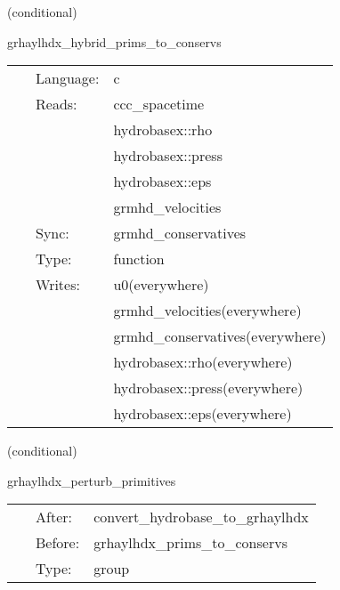 \documentclass{article}
\begin{document}
\vspace{5mm}

   (conditional) 

\hspace{5mm} grhaylhdx\_hybrid\_prims\_to\_conservs 

\hspace{5mm}{\it hybrid version of grhaylhdx\_prims\_to\_conservs } 


\hspace{5mm}

 \begin{tabular*}{160mm}{cll} 
~ & Language:  & c \\ 
~ & Reads:  & ccc\_spacetime \\ 
~& ~ &hydrobasex::rho\\ 
~& ~ &hydrobasex::press\\ 
~& ~ &hydrobasex::eps\\ 
~& ~ &grmhd\_velocities\\ 
~ & Sync:  & grmhd\_conservatives \\ 
~ & Type:  & function \\ 
~ & Writes:  & u0(everywhere) \\ 
~& ~ &grmhd\_velocities(everywhere)\\ 
~& ~ &grmhd\_conservatives(everywhere)\\ 
~& ~ &hydrobasex::rho(everywhere)\\ 
~& ~ &hydrobasex::press(everywhere)\\ 
~& ~ &hydrobasex::eps(everywhere)\\ 
\end{tabular*} 


\vspace{5mm}

   (conditional) 

\hspace{5mm} grhaylhdx\_perturb\_primitives 

\hspace{5mm}{\it perturb initial primitive data } 


\hspace{5mm}

 \begin{tabular*}{160mm}{cll} 
~ & After:  & convert\_hydrobase\_to\_grhaylhdx \\ 
~ & Before:  & grhaylhdx\_prims\_to\_conservs \\ 
~ & Type:  & group \\ 
\end{tabular*} 
\end{document}
